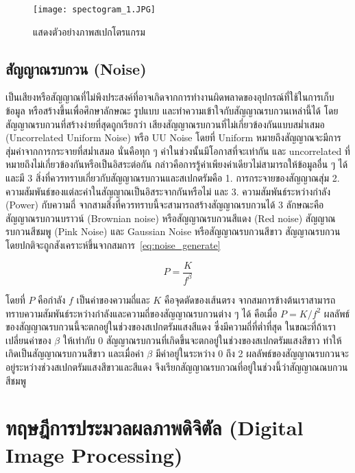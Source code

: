 \begin{figure}[h]
    \centering
    \texttt{[image: spectogram\_1.JPG]}
    \caption{แสดงตัวอย่างภาพสเปกโตรแกรม}
    \label{Fig:specto_gram_1}
\end{figure}

\subsection{สัญญาณรบกวน (Noise)}
เป็นเสียงหรือสัญญาณที่ไม่พึงประสงค์ที่อาจเกิดจากการทำงานผิดพลาดของอุปกรณ์ที่ใช้ในการเก็บข้อมูล หรือสร้างขึ้นเพื่อศึกษาลักษณะ รูปแบบ และทำความเข้าใจกับสัญญาณรบกวนเหล่านี้ได้
โดยสัญญาณรบกวนที่สร้างง่ายที่สุดถูกเรียกว่า เสียงสัญญาณรบกวนที่ไม่เกี่ยวข้องกันแบบสม่ำเสมอ (Uncorrelated Uniform Noise) หรือ UU Noise โดยที่ Uniform หมายถึงสัญญาณจะมีการสุ่มค่าจากการกระจายที่สม่ำเสมอ 
นั่นคือทุก ๆ ค่าในช่วงนั้นมีโอกาสที่จะเท่ากัน และ uncorrelated ที่หมายถึงไม่เกี่ยวข้องกันหรือเป็นอิสระต่อกัน กล่าวคือการรู้ค่าเพียงค่าเดียวไม่สามารถให้ข้อมูลอื่น ๆ ได้
และมี 3 สิ่งที่ควรทราบเกี่ยวกับสัญญาณรบกวนและสเปกตรัมคือ 1. การกระจายของสัญญาณสุ่ม 2. ความสัมพันธ์ของแต่ละค่าในสัญญาณเป็นอิสระจากกันหรือไม่ 
และ 3. ความสัมพันธ์ระหว่างกำลัง (Power) กับความถี่ จากสามสิ่งที่ควรทราบนี้จะสามารถสร้างสัญญาณรบกวนได้ 3 ลักษณะคือ สัญญาณรบกวนบราวน์ (Brownian noise) 
หรือสัญญาณรบกวนสีแดง (Red noise) สัญญาณรบกวนสีชมพู (Pink Noise) และ Gaussian Noise หรือสัญญาณรบกวนสีขาว สัญญาณรบกวนโดยปกติจะถูกสังเคราะห์ขึ้นจากสมการ~\ref{eq:noise_generate}

\begin{equation}
    P = \frac{K}{f^{\beta}}
    \label{eq:noise_generate}
\end{equation}

โดยที่ $P$ คือกำลัง $f$ เป็นค่าของความถี่และ $K$ คือจุดตัดของเส้นตรง จากสมการข้างต้นเราสามารถทราบความสัมพันธ์ระหว่างกำลังและความถี่ของสัญญาณรบกวนต่าง ๆ ได้ คือเมื่อ
$P = K / f^{2}$ ผลลัพธ์ของสัญญาณรบกวนนี้จะตกอยู่ในช่วงของสเปกตรัมแสงสีแดง ซึ่งมีความถี่ที่ต่ำที่สุด ในขณะที่ถ้าเราเปลี่ยนค่าของ $\beta$ ให้เท่ากับ 0 สัญญาณรบกวนที่เกิดขึ้นจะตกอยู่ในช่วงของสเปกตรัมแสงสีขาว 
ทำให้เกิดเป็นสัญญาณรบกวนสีขาว และเมื่อค่า $\beta$ มีค่าอยู่ในระหว่าง 0 ถึง 2 ผลลัพธ์ของสัญญาณรบกวนจะอยู่ระหว่างช่วงสเปกตรัมแสงสีขาวและสีแดง จึงเรียกสัญญาณรบกวณที่อยู่ในช่วงนี้ว่าสัญญาณณบกวนสีชมพู

\section{ทฤษฎีการประมวลผลภาพดิจิตัล (Digital Image Processing)}

